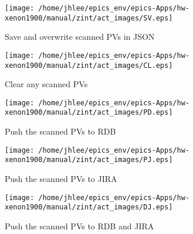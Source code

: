 \noindent
\vspace{1.4cm}
\begin{minipage}{.2\textwidth}
\begin{center}
\texttt{[image: /home/jhlee/epics\_env/epics-Apps/hw-xenon1900/manual/zint/act\_images/SV.eps]}
\end{center}
\end{minipage}
\begin{minipage}{.7\textwidth}
Save and overwrite scanned PVs in JSON
\end{minipage}


\noindent
\vspace{1.4cm}
\begin{minipage}{.2\textwidth}
\begin{center}
\texttt{[image: /home/jhlee/epics\_env/epics-Apps/hw-xenon1900/manual/zint/act\_images/CL.eps]}
\end{center}
\end{minipage}
\begin{minipage}{.7\textwidth}
Clear any scanned PVs
\end{minipage}


\noindent
\vspace{1.4cm}
\begin{minipage}{.2\textwidth}
\begin{center}
\texttt{[image: /home/jhlee/epics\_env/epics-Apps/hw-xenon1900/manual/zint/act\_images/PD.eps]}
\end{center}
\end{minipage}
\begin{minipage}{.7\textwidth}
Push the scanned PVs to RDB
\end{minipage}


\noindent
\vspace{1.4cm}
\begin{minipage}{.2\textwidth}
\begin{center}
\texttt{[image: /home/jhlee/epics\_env/epics-Apps/hw-xenon1900/manual/zint/act\_images/PJ.eps]}
\end{center}
\end{minipage}
\begin{minipage}{.7\textwidth}
Push the scanned PVs to JIRA
\end{minipage}


\noindent
\vspace{1.4cm}
\begin{minipage}{.2\textwidth}
\begin{center}
\texttt{[image: /home/jhlee/epics\_env/epics-Apps/hw-xenon1900/manual/zint/act\_images/DJ.eps]}
\end{center}
\end{minipage}
\begin{minipage}{.7\textwidth}
Push the scanned PVs to RDB and JIRA
\end{minipage}


